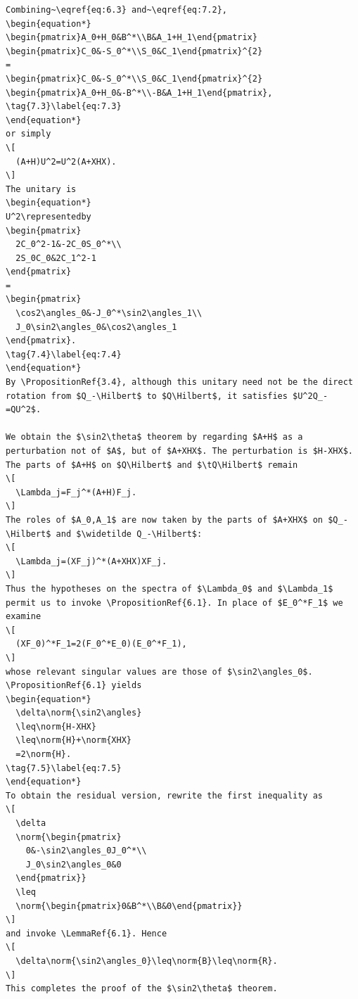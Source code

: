 \begin{verbatim}
Combining~\eqref{eq:6.3} and~\eqref{eq:7.2},
\begin{equation*}
\begin{pmatrix}A_0+H_0&B^*\\B&A_1+H_1\end{pmatrix}
\begin{pmatrix}C_0&-S_0^*\\S_0&C_1\end{pmatrix}^{2}
=
\begin{pmatrix}C_0&-S_0^*\\S_0&C_1\end{pmatrix}^{2}
\begin{pmatrix}A_0+H_0&-B^*\\-B&A_1+H_1\end{pmatrix},
\tag{7.3}\label{eq:7.3}
\end{equation*}
or simply
\[
  (A+H)U^2=U^2(A+XHX).
\]
The unitary is
\begin{equation*}
U^2\representedby
\begin{pmatrix}
  2C_0^2-1&-2C_0S_0^*\\
  2S_0C_0&2C_1^2-1
\end{pmatrix}
=
\begin{pmatrix}
  \cos2\angles_0&-J_0^*\sin2\angles_1\\
  J_0\sin2\angles_0&\cos2\angles_1
\end{pmatrix}.
\tag{7.4}\label{eq:7.4}
\end{equation*}
By \PropositionRef{3.4}, although this unitary need not be the direct rotation from $Q_-\Hilbert$ to $Q\Hilbert$, it satisfies $U^2Q_-=QU^2$.

We obtain the $\sin2\theta$ theorem by regarding $A+H$ as a perturbation not of $A$, but of $A+XHX$. The perturbation is $H-XHX$. The parts of $A+H$ on $Q\Hilbert$ and $\tQ\Hilbert$ remain
\[
  \Lambda_j=F_j^*(A+H)F_j.
\]
The roles of $A_0,A_1$ are now taken by the parts of $A+XHX$ on $Q_-\Hilbert$ and $\widetilde Q_-\Hilbert$:
\[
  \Lambda_j=(XF_j)^*(A+XHX)XF_j.
\]
Thus the hypotheses on the spectra of $\Lambda_0$ and $\Lambda_1$ permit us to invoke \PropositionRef{6.1}. In place of $E_0^*F_1$ we examine
\[
  (XF_0)^*F_1=2(F_0^*E_0)(E_0^*F_1),
\]
whose relevant singular values are those of $\sin2\angles_0$. \PropositionRef{6.1} yields
\begin{equation*}
  \delta\norm{\sin2\angles}
  \leq\norm{H-XHX}
  \leq\norm{H}+\norm{XHX}
  =2\norm{H}.
\tag{7.5}\label{eq:7.5}
\end{equation*}
To obtain the residual version, rewrite the first inequality as
\[
  \delta
  \norm{\begin{pmatrix}
    0&-\sin2\angles_0J_0^*\\
    J_0\sin2\angles_0&0
  \end{pmatrix}}
  \leq
  \norm{\begin{pmatrix}0&B^*\\B&0\end{pmatrix}}
\]
and invoke \LemmaRef{6.1}. Hence
\[
  \delta\norm{\sin2\angles_0}\leq\norm{B}\leq\norm{R}.
\]
This completes the proof of the $\sin2\theta$ theorem.


\end{verbatim}
